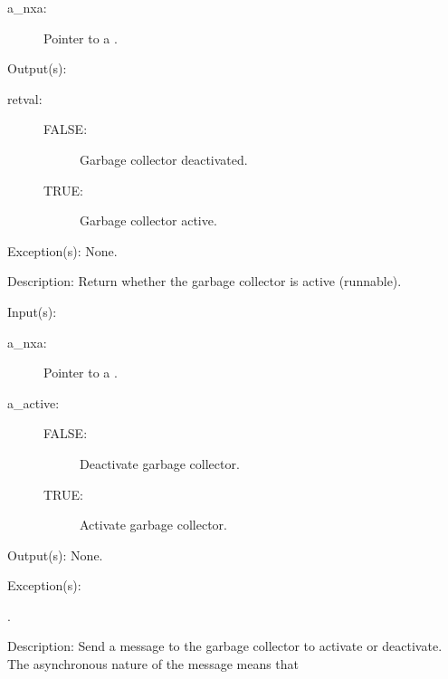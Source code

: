 \begin{capi}
\begin{capilist}
		\begin{description}\item[]
		\item[a\_nxa: ]
			Pointer to a .
		\end{description}
	\item[Output(s): ]
		\begin{description}\item[]
		\item[retval: ]
			\begin{description}\item[]
			\item[FALSE: ]
				Garbage collector deactivated.
			\item[TRUE: ]
				Garbage collector active.
			\end{description}
		\end{description}
	\item[Exception(s): ] None.
	\item[Description: ]
		Return whether the garbage collector is active (runnable).
	\end{capilist}
\label{nxa_active_set}
	\begin{capilist}
	\item[Input(s): ]
		\begin{description}\item[]
		\item[a\_nxa: ]
			Pointer to a .
		\item[a\_active: ]
			\begin{description}\item[]
			\item[FALSE: ]
				Deactivate garbage collector.
			\item[TRUE: ]
				Activate garbage collector.
			\end{description}
		\end{description}
	\item[Output(s): ] None.
	\item[Exception(s): ]
		\begin{description}\item[]
		\item[.]
		\end{description}
	\item[Description: ]
		Send a message to the garbage collector to activate or
		deactivate.  The asynchronous nature of the message means that

\end{capilist}
\end{capi}
